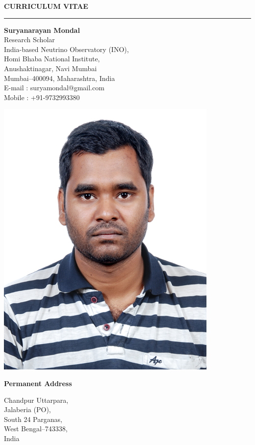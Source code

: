 \documentclass[12pt]{article}
\begin{document}
\hypersetup{urlcolor=DarkBlue}
\pagestyle{plain}
\flushleft
{\bf {CURRICULUM VITAE }}\\
\noindent\rule{18cm}{0.2pt}
\vspace{0.05cm}
\noindent

\begin{minipage}{0.8\textwidth}
 {\bf{Suryanarayan Mondal}} \\[0.4em]
Research Scholar\\
India-based Neutrino Observatory (INO),\\
Homi Bhaba National Institute, \\
Anushaktinagar, Navi Mumbai\\
Mumbai--400094, Maharashtra, India \\
E-mail : suryamondal@gmail.com\\
Mobile : +91-9732993380 \\[0.1em]
\end{minipage}%
\begin{minipage}{0.5\textwidth}
\includegraphics[width=0.45\linewidth]{./SMA454.jpg}
\end{minipage}

\vspace{0.6cm}
{\bf {Permanent Address }}\\
\begin{minipage}{0.8\textwidth}
  \vspace{0.3cm}
  Chandpur Uttarpara,\\
  Jalaberia (PO),\\
  South 24 Parganas,\\
  West Bengal--743338,\\
  India
\end{minipage}
\end{document}
